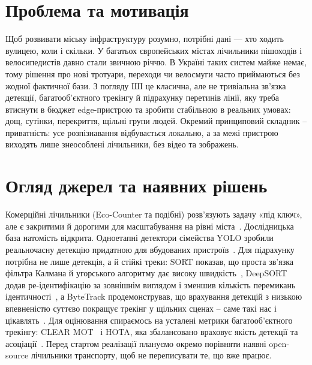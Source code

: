 \documentclass[ukrainian]{ucuproposal}
\begin{document}
\maketitlepage

\section{Проблема та мотивація}
Щоб розвивати міську інфраструктуру розумно, потрібні дані — хто ходить вулицею, коли і скільки. У багатьох європейських містах лічильники пішоходів і велосипедистів давно стали звичною річчю. В Україні таких систем майже немає, тому рішення про нові тротуари, переходи чи велосмуги часто приймаються без жодної фактичної бази. З погляду ШІ це класична, але
не тривіальна зв'язка детекції, багатооб'єктного трекінгу й підрахунку перетинів
лінії, яку треба втиснути в бюджет edge-пристрою та зробити стабільною в реальних
умовах: дощ, сутінки, перекриття, щільні групи людей. Окремий принциповий складник –
приватність: усе розпізнавання відбувається локально, а за межі пристрою виходять
лише знеособлені лічильники, без відео та зображень.

\section{Огляд джерел та наявних рішень}
Комерційні лічильники (Eco-Counter та подібні) розв'язують задачу «під ключ», але є
закритими й дорогими для масштабування на рівні міста~\cite{ecocounter}.
Дослідницька база натомість відкрита. Одноетапні детектори сімейства YOLO зробили
реальночасну детекцію придатною для вбудованих пристроїв~\cite{redmon2016,jocher2023}.
Для підрахунку потрібна не лише детекція, а й стійкі треки: SORT показав, що проста
зв'язка фільтра Калмана й угорського алгоритму дає високу швидкість~\cite{bewley2016},
DeepSORT додав ре-ідентифікацію за зовнішнім виглядом і зменшив кількість
перемикань ідентичності~\cite{wojke2017}, а ByteTrack продемонстрував, що врахування
детекцій з низькою впевненістю суттєво покращує трекінг у щільних сценах – саме
такі нас і цікавлять~\cite{zhang2022}. Для оцінювання спираємось на усталені метрики
багатооб'єктного трекінгу: CLEAR MOT~\cite{bernardin2008} і HOTA, яка збалансовано
враховує якість детекції та асоціації~\cite{luiten2021}. Перед стартом реалізації
плануємо окремо порівняти наявні open-source лічильники транспорту, щоб не
переписувати те, що вже працює.
\end{document}
